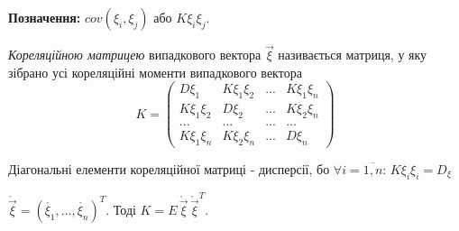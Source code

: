 \noindent \textbf{Позначення:} 
$cov(\xi_i,\xi_j)$ або 
$K\xi_i\xi_j$.

\begin{definition}
   \emph{Кореляційною матрицею} випадкового 
   вектора $\vec{\xi}$ називається матриця, у яку зібрано усі 
   кореляційні моменти випадкового вектора
   \begin{equation*}
       K = 
       \begin{pmatrix}
           D\xi_1 & K\xi_1\xi_2 & ... & K\xi_1\xi_n \\
           K\xi_1\xi_2 & D\xi_2 & ... & K\xi_2\xi_n \\
           ... & ... & ... & ...\\
           K\xi_1\xi_n & K\xi_2\xi_n & ... & D\xi_n
       \end{pmatrix}
   \end{equation*} 
\end{definition}
\begin{remark}[1]
    Діагональні елементи кореляційної матриці - дисперсії, бо 
    $\forall i = \overline{1,n} $: $K\xi_i\xi_i = D_\xi$
\end{remark}
\begin{remark}[2]
    $\mathring{\vec{\xi}} = \left(\mathring{\xi_1}, ..., \mathring{\xi_n}
    \right)^T$.
    Тоді $K = E\,\mathring{\vec{\xi}}\,\mathring{\vec{\xi}}^T$.
\end{remark}

